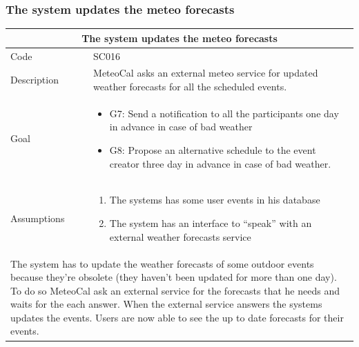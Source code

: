 \documentclass[10pt,a4paper,titlepage]{article}
\begin{document}
\subsubsection{The system updates the meteo forecasts}
\begin{tabular}{| p{3cm} | p{10cm} |}
\hline \multicolumn{2}{|c|}{\textbf{The system updates the meteo forecasts}} \\ 
\hline Code & SC016 \\ 
\hline Description & MeteoCal asks an external meteo service for updated weather forecasts for all the scheduled events. \\
\hline Goal & \begin{itemize}
\item G7: Send a notification to all the participants one day in advance in case of bad weather
\item G8: Propose an alternative schedule to the event creator three day in advance in case of bad weather.
\end{itemize}\\
\hline Assumptions  & \begin{enumerate}
\item The systems has some user events in his database
\item The system has an interface to “speak” with an external weather forecasts service
\end{enumerate} \\
\hline \multicolumn{2}{|p{13cm}|}{The system has to update the weather forecasts of some outdoor events because they’re obsolete (they haven’t been updated for more than one day). To do so MeteoCal ask an external service for the forecasts that he needs and waits for the each answer. When the external service answers the systems updates the events. Users are now  able to see the up to date forecasts for their events.}\\
\hline
\end{tabular}
\end{document}
